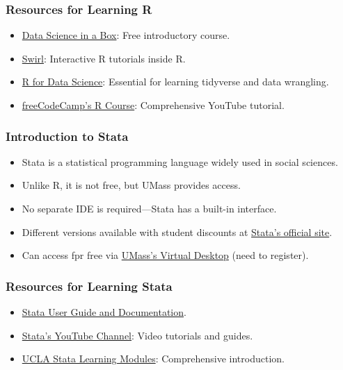 \documentclass{beamer}
\begin{document}
\begin{frame}
    \frametitle{Resources for Learning R}
\begin{itemize}
    \item \href{https://datasciencebox.org/}{Data Science in a Box}: Free introductory course.
    \item \href{https://swirlstats.com/}{Swirl}: Interactive R tutorials inside R.
    \item \href{https://r4ds.hadley.nz/}{R for Data Science}: Essential for learning tidyverse and data wrangling.
    \item \href{https://www.youtube.com/watch?v=_V8eKsto3Ug}{freeCodeCamp's R Course}: Comprehensive YouTube tutorial.
\end{itemize}
\end{frame}

\begin{frame}
    \frametitle{Introduction to Stata}
\begin{itemize}
    \item Stata is a statistical programming language widely used in social sciences.
    \item Unlike R, it is not free, but UMass provides access.
    \item No separate IDE is required—Stata has a built-in interface.
    \item Different versions available with student discounts at \href{https://www.stata.com/order/}{Stata's official site}.
    \item Can access fpr free via \href{https://www.umass.edu/it/azure-virtual-desktop}{UMass's Virtual Desktop} (need to register).
\end{itemize}
\end{frame}

\begin{frame}
    \frametitle{Resources for Learning Stata}
\begin{itemize}
    \item \href{https://www.stata.com/features/documentation/}{Stata User Guide and Documentation}.
    \item \href{https://www.youtube.com/user/statacorp}{Stata's YouTube Channel}: Video tutorials and guides.
    \item \href{https://stats.oarc.ucla.edu/stata/}{UCLA Stata Learning Modules}: Comprehensive introduction.
\end{itemize}
\end{frame}
\end{document}
